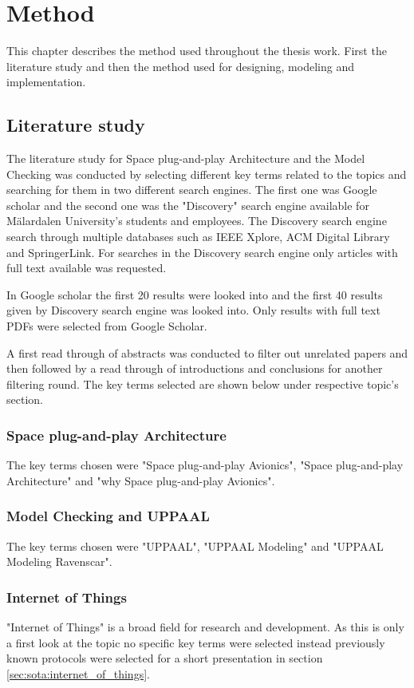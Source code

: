 \chapter{Method}\label{ch:method}
This chapter describes the method used throughout the thesis work. First
the literature study and then the method used for designing, modeling and
implementation.

\section{Literature study}
The literature study for Space plug-and-play Architecture and the Model
Checking was conducted by selecting different key terms related to the topics
and searching for them in two different search engines. The first one was
Google scholar and the second one was the "Discovery" search engine available
for M\"{a}lardalen University's students and employees. The Discovery search engine
search through multiple databases such as IEEE Xplore, ACM Digital Library and
SpringerLink. For searches in the Discovery search engine only articles with
full text available was requested.

In Google scholar the first 20 results were looked into and the first 40
results given by Discovery search engine was looked into. Only results with
full text PDFs were selected from Google Scholar.

A first read through of abstracts was conducted to filter out unrelated
papers and then followed by a read through of introductions and conclusions for
another filtering round. The key terms selected are shown below under
respective topic's section.

\subsection{Space plug-and-play Architecture}
The key terms chosen were "Space plug-and-play Avionics", "Space
plug-and-play Architecture" and "why Space plug-and-play Avionics".

\subsection{Model Checking and UPPAAL}
The key terms chosen were "UPPAAL", "UPPAAL Modeling" and "UPPAAL Modeling
Ravenscar".

\subsection{Internet of Things}
"Internet of Things" is a broad field for research and development. As this is
only a first look at the topic no specific key terms were selected instead
previously known protocols were selected for a short presentation in section
\ref{sec:sota:internet_of_things}.


